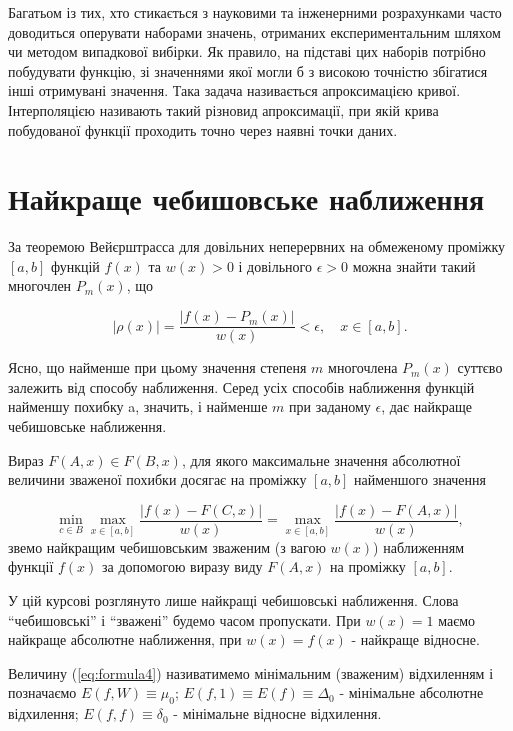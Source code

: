 \documentclass[ukrainian,14pt]{extarticle}
\begin{document}
Багатьом із тих, хто стикається з науковими та інженерними розрахунками часто доводиться оперувати наборами значень, отриманих експериментальним шляхом чи методом випадкової вибірки. Як правило, на підставі цих наборів потрібно побудувати функцію, зі значеннями якої могли б з високою точністю збігатися інші отримувані значення. Така задача називається апроксимацією кривої. Інтерполяцією називають такий різновид апроксимації, при якій крива побудованої функції проходить точно через наявні точки даних.

\newpage


\section{Найкраще чебишовське наближення}

За теоремою Вейєрштрасса для довільних неперервних на обмеженому проміжку $[a,b]$   
функцій $f(x)$ та $w(x) > 0$ і довільного $\epsilon > 0$ можна знайти такий многочлен $P_m(x)$, що

$$|\rho(x)| = \frac{|f(x) - P_m(x)|}{w(x)} < \epsilon, \quad x \in [a,b].$$

Ясно, що найменше при цьому значення степеня $m$ многочлена $P_m(x)$ суттєво залежить від способу наближення. Серед усіх способів наближення функцій найменшу похибку a, значить, і найменше $m$ при заданому $\epsilon$, дає найкраще чебишовське наближення.

Вираз $F(A,x) \in F(B,x)$, для якого максимальне значення абсолютної величини зваженої похибки досягає на проміжку $[a,b]$ найменшого значення

\begin{equation}\label{eq:formula4}
\min_{c \in B} \max_{x \in [a,b]} \frac{|f(x) - F(C,x)|}{w(x)} = \max_{x \in [a,b]} \frac{|f(x) - F(A,x)|}{w(x)},
\end{equation}
звемо найкращим чебишовським зваженим (з вагою $w(x)$) наближенням функції $f(x)$ за допомогою виразу виду $F(A,x)$ на проміжку $[a,b]$.

У цій курсові розглянуто лише найкращі чебишовські наближення. Слова ``чебишовські'' і ``зважені'' будемо часом пропускати. При $w(x) = 1$ маємо найкраще абсолютне наближення, при $w(x) = f(x)$ - найкраще відносне.

Величину (\ref{eq:formula4}) називатимемо мінімальним (зваженим) відхиленням і позначаємо $E(f,W)\equiv\mu_0$; $E(f,1) \equiv E(f) \equiv \Delta_0$ - мінімальне абсолютне відхилення; $E(f,f) \equiv \delta_0$ - мінімальне відносне відхилення.
\end{document}
